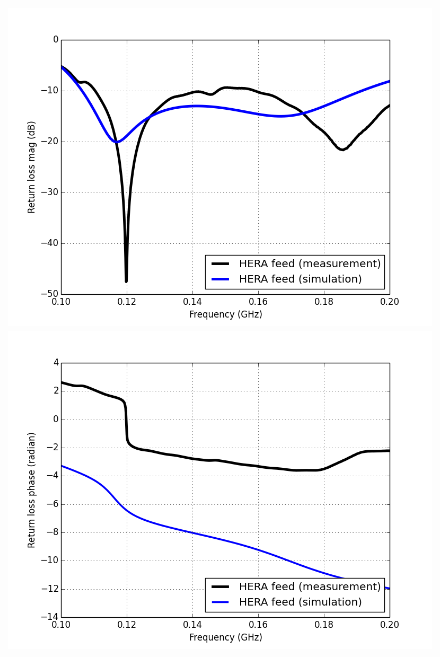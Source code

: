 \documentclass[twocolumn]{emulateapj}
\begin{document}
    \begin{figure}[ht]
    \begin{minipage}[b]{0.5\linewidth}
    \centering
    \includegraphics[angle=0, width=\linewidth]{GB_reflectometry_part3/plot/RL_feed_mag.png}
    \end{minipage}
    \hspace{0.1cm}
    \begin{minipage}[b]{0.5\linewidth}
    \centering
    \includegraphics[angle=0, width=\linewidth]{GB_reflectometry_part3/plot/RL_feed_ph.png}
    \end{minipage}
    \vspace{0.1cm}  
    \begin{minipage}[b]{0.5\linewidth}

\end{minipage}
\end{figure}
\end{document}
